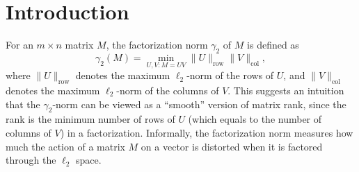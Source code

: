 \documentclass[11pt]{amsart}
\theoremstyle{plain}
\theoremstyle{definition}
\DeclareMathOperator{\row}{row}
\DeclareMathOperator{\col}{col}
\begin{document}
\maketitle

\section{Introduction}
For an $m \times n$ matrix $M$, the factorization norm $\gamma_2$ of $M$ is defined as  $$\gamma_2(M)=\min_{U, V : M=UV}\|U\|_{\row}\|V\|_{\col},$$
where $\|U\|_{\row}$ denotes the maximum $\ell_2$-norm of the rows of $U$, and $\|V\|_{\col}$ denotes the maximum $\ell_2$-norm of the columns of $V$. This suggests an intuition that the $\gamma_2$-norm can be viewed as a ``smooth'' version of matrix rank, since the rank is the minimum number of rows of $U$ (which equals to the number of columns of $V$) in a factorization.
Informally, the factorization norm measures how much the action of a matrix $M$ on a vector is distorted  when it is factored through the $\ell_2$ space. 


\end{document}
